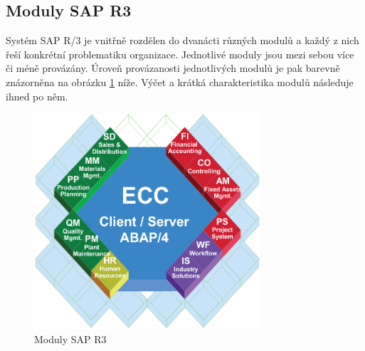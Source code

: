 \documentclass[thesis=M,czech]{FITthesis}[2012/06/26]
\begin{document}
\subsection{Moduly SAP R3}
Systém SAP R/3 je vnitřně rozdělen do dvanácti různých modulů a každý z nich řeší konkrétní problematiku organizace. Jednotlivé moduly jsou  mezi sebou více či méně provázány. Úroveň provázanosti jednotlivých modulů je pak barevně znázorněna na obrázku \ref{img:sapr3} níže. Výčet a krátká charakteristika modulů následuje ihned po něm.

\begin{figure}[H]
	\centering
	\includegraphics[width=0.75\textwidth]{images/sap_r3}
	\caption{Moduly SAP R3 \cite{sap_r3_modules}}
	\label{img:sapr3}
\end{figure}
\end{document}
